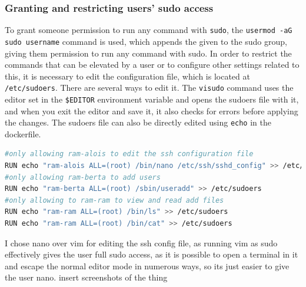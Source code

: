 \documentclass[a4paper]{article}
\newcommand{\abc}{\hfill \break}
\begin{document}
\subsubsection{Granting and restricting users' sudo access}
To grant someone permission to run any command with \texttt{sudo}, the \texttt{usermod -aG sudo username} command is used, which appends the given to the sudo group, giving them permission to run any command with sudo. \abc
In order to restrict the commands that can be elevated by a user or to configure other settings related to this, it is necessary to edit the configuration file, which is located at \texttt{/etc/sudoers}.\abc
There are several ways to edit it. The \texttt{visudo} command uses the editor set in the \texttt{\$EDITOR} environment variable and opens the sudoers file with it, and when you exit the editor and save it, it also checks for errors before applying the changes.
The sudoers file can also be directly edited using \texttt{echo} in the dockerfile.
\begin{lstlisting}[language=bash]
#only allowing ram-alois to edit the ssh configuration file
RUN echo "ram-alois ALL=(root) /bin/nano /etc/ssh/sshd_config" >> /etc/sudoers
#only allowing ram-berta to add users
RUN echo "ram-berta ALL=(root) /sbin/useradd" >> /etc/sudoers
#only allowing to ram-ram to view and read add files
RUN echo "ram-ram ALL=(root) /bin/ls" >> /etc/sudoers
RUN echo "ram-ram ALL=(root) /bin/cat" >> /etc/sudoers
\end{lstlisting}
I chose nano over vim for editing the ssh config file, as running vim as sudo effectively gives the user full sudo access, as it is possible to open a terminal in it and escape the normal editor mode in numerous ways, so its just easier to give the user nano.\abc
insert screenshots of the thing
\newpage
\end{document}
